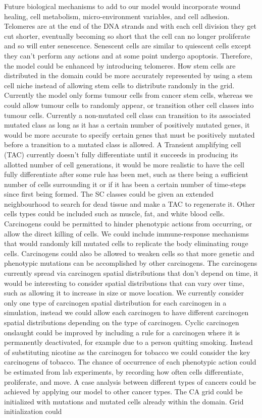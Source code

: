 \documentclass[\main/thesis.tex]{subfiles}
\begin{document}
Future biological mechanisms to add to our model would incorporate wound healing, cell metabolism, micro-environment variables, and cell adhesion. \newline Telomeres are at the end of the DNA strands and with each cell division they get cut shorter, eventually becoming so short that the cell can no longer proliferate and so will enter senescence. Senescent cells are similar to quiescent cells except they can’t perform any actions and at some point undergo apoptosis. Therefore, the model could be enhanced by introducing telomeres. How stem cells are distributed in the domain could be more accurately represented by using a stem cell niche instead of allowing stem cells to distribute randomly in the grid. Currently the model only forms tumour cells from cancer stem cells, whereas we could allow tumour cells to randomly appear, or transition other cell classes into tumour cells. Currently a non-mutated cell class can transition to its associated mutated class as long as it has a certain number of positively mutated genes, it would be more accurate to specify certain genes that must be positively mutated before a transition to a mutated class is allowed. A Transient amplifying cell (TAC) currently doesn't fully differentiate until it succeeds in producing its allotted number of cell generations, it would be more realistic to have the cell fully differentiate after some rule has been met, such as there being a sufficient number of cells surrounding it or if it has been a certain number of time-steps since first being formed. The SC classes could be given an extended neighbourhood to search for dead tissue and make a TAC to regenerate it. Other cells types could be included such as muscle, fat, and white blood cells. Carcinogens could be permitted to hinder phenotypic actions from occurring, or allow the direct killing of cells. We could include immune-response mechanisms that would randomly kill mutated cells to replicate the body eliminating rouge cells. Carcinogens could also be allowed to weaken cells so that more genetic and phenotypic mutations can be accomplished by other carcinogens. The carcinogens currently spread via carcinogen spatial distributions that don't depend on time, it would be interesting to consider spatial distributions that can vary over time, such as allowing it to increase in size or move location. We currently consider only one type of carcinogen spatial distribution for each carcinogen in a simulation, instead we could allow each carcinogen to have different carcinogen spatial distributions depending on the type of carcinogen. Cyclic carcinogen onslaught could be improved by including a rule for a carcinogen where it is permanently deactivated, for example due to a person quitting smoking. Instead of substituting nicotine as the carcinogen for tobacco we could consider the key carcinogens of tobacco. The chance of occurrence of each phenotypic action could be estimated from lab experiments, by recording how often cells differentiate, proliferate, and move. A case analysis between different types of cancers could be achieved by applying our model to other cancer types. The CA grid could be initialized with mutations and mutated cells already within the domain. Grid initialization could 
\end{document}
